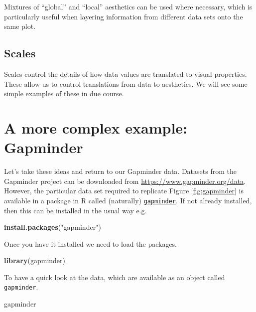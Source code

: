 \documentclass[]{book}
\newenvironment{Shaded}{\begin{snugshade}}{\end{snugshade}}
\newcommand{\KeywordTok}[1]{\textcolor[rgb]{0.13,0.29,0.53}{\textbf{{#1}}}}
\newcommand{\StringTok}[1]{\textcolor[rgb]{0.31,0.60,0.02}{{#1}}}
\newcommand{\NormalTok}[1]{{#1}}
\theoremstyle{definition}
\theoremstyle{definition}
\theoremstyle{definition}
\theoremstyle{remark}
\begin{document}
Mixtures of ``global'' and ``local'' aesthetics can be used where
necessary, which is particularly useful when layering information from
different data sets onto the same plot.

\subsection{Scales}\label{scales}

Scales control the details of how data values are translated to visual
properties. These allow us to control translations from data to
aesthetics. We will see some simple examples of these in due course.

\section{A more complex example:
Gapminder}\label{a-more-complex-example-gapminder}

Let's take these ideas and return to our Gapminder data. Datasets from
the Gapminder project can be downloaded from
\url{https://www.gapminder.org/data}. However, the particular data set
required to replicate Figure \ref{fig:gapminder} is available in a
package in R called (naturally)
\href{https://cran.r-project.org/web/packages/gapminder/index.html}{\texttt{gapminder}}.
If not already installed, then this can be installed in the usual way
e.g.

\begin{Shaded}
\begin{Highlighting}[]
\KeywordTok{install.packages}\NormalTok{(}\StringTok{"gapminder"}\NormalTok{)}
\end{Highlighting}
\end{Shaded}

Once you have it installed we need to load the packages.

\begin{Shaded}
\begin{Highlighting}[]
\KeywordTok{library}\NormalTok{(gapminder)}
\end{Highlighting}
\end{Shaded}

To have a quick look at the data, which are available as an object
called \texttt{gapminder}.

\begin{Shaded}
\begin{Highlighting}[]
\NormalTok{gapminder}
\end{Highlighting}
\end{Shaded}
\end{document}
